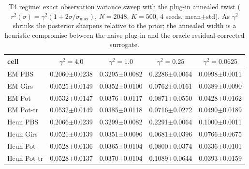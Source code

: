 \begin{table}[ht]
\centering
\caption{T4 regime: exact observation variance sweep with the plug-in annealed twist ($r^2(\sigma)=\gamma^2(1+2\sigma/\sigma_{\max})$, $N=2048$, $K=500$, 4 seeds, mean$\pm$std).  As $\gamma^2$ shrinks the posterior sharpens relative to the prior; the annealed width is a heuristic compromise between the naive plug-in and the oracle residual-corrected surrogate.}
\label{tab:toy_t4}
\begin{tabular}{lcccc}
\toprule
cell & $\gamma^2=4.0$ & $\gamma^2=1.0$ & $\gamma^2=0.25$ & $\gamma^2=0.0625$ \\
\midrule
EM PBS & 0.2060$\pm$0.0238 & 0.3295$\pm$0.0082 & 0.2286$\pm$0.0064 & 0.0998$\pm$0.0011 \\
EM Girs & 0.0525$\pm$0.0149 & 0.0352$\pm$0.0100 & 0.0762$\pm$0.0161 & 0.0389$\pm$0.0090 \\
EM Pot & 0.0532$\pm$0.0147 & 0.0376$\pm$0.0117 & 0.0871$\pm$0.0550 & 0.0428$\pm$0.0162 \\
EM Pot-tr & 0.0532$\pm$0.0149 & 0.0385$\pm$0.0118 & 0.0716$\pm$0.0272 & 0.0490$\pm$0.0189 \\
Heun PBS & 0.2066$\pm$0.0239 & 0.3299$\pm$0.0082 & 0.2291$\pm$0.0064 & 0.1000$\pm$0.0011 \\
Heun Girs & 0.0521$\pm$0.0139 & 0.0351$\pm$0.0096 & 0.0681$\pm$0.0396 & 0.0766$\pm$0.0675 \\
Heun Pot & 0.0528$\pm$0.0136 & 0.0365$\pm$0.0104 & 0.0800$\pm$0.0374 & 0.0336$\pm$0.0101 \\
Heun Pot-tr & 0.0528$\pm$0.0137 & 0.0370$\pm$0.0104 & 0.1089$\pm$0.0644 & 0.0393$\pm$0.0159 \\
\bottomrule
\end{tabular}
\end{table}
